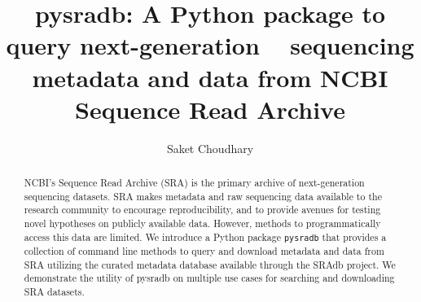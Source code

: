 \documentclass[9pt,a4paper]{extarticle}
\begin{document}
\pagestyle{front}
\title{pysradb: A Python package to query next-generation ~ sequencing metadata
and data from NCBI Sequence Read Archive}

\author[]{Saket Choudhary}


\maketitle
\thispagestyle{front}


\begin{abstract}





NCBI’s Sequence Read Archive (SRA) is the primary archive of next-generation 
sequencing datasets. SRA makes metadata and raw sequencing data available to the
research community to encourage reproducibility, and to provide avenues for 
testing novel hypotheses on publicly available data. However, methods to
programmatically access this data are limited. We introduce a
Python package \texttt{pysradb} that provides a collection of  command
line methods to query and download metadata and data from SRA utilizing the
curated metadata database available through the SRAdb project. We demonstrate 
the utility of pysradb on multiple use cases for searching and downloading SRA datasets.


\end{abstract}
\end{document}
